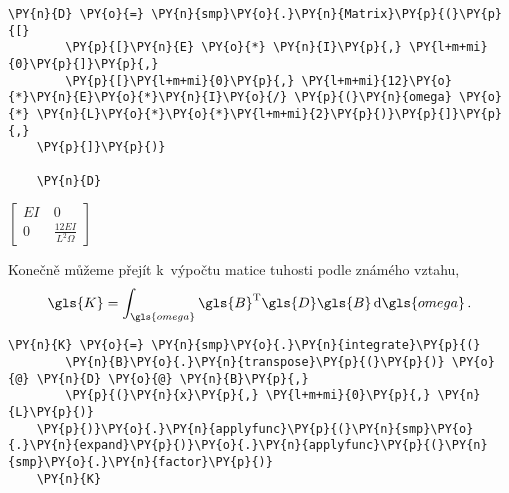 \begin{tcolorbox}[breakable, size=fbox, boxrule=1pt, pad at break*=1mm,colback=cellbackground, colframe=cellborder]
    \begin{Verbatim}[commandchars=\\\{\}]
    \PY{n}{D} \PY{o}{=} \PY{n}{smp}\PY{o}{.}\PY{n}{Matrix}\PY{p}{(}\PY{p}{[}
        \PY{p}{[}\PY{n}{E} \PY{o}{*} \PY{n}{I}\PY{p}{,} \PY{l+m+mi}{0}\PY{p}{]}\PY{p}{,}
        \PY{p}{[}\PY{l+m+mi}{0}\PY{p}{,} \PY{l+m+mi}{12}\PY{o}{*}\PY{n}{E}\PY{o}{*}\PY{n}{I}\PY{o}{/} \PY{p}{(}\PY{n}{omega} \PY{o}{*} \PY{n}{L}\PY{o}{*}\PY{o}{*}\PY{l+m+mi}{2}\PY{p}{)}\PY{p}{]}\PY{p}{,}
    \PY{p}{]}\PY{p}{)}
    
    \PY{n}{D}
    \end{Verbatim}
\end{tcolorbox}
     
                
    
    $\displaystyle \left[\begin{matrix}E I~& 0\\0 & \frac{12 E I}{L^{2} \Omega}\end{matrix}\right]$

\vspace{0.3cm}
Konečně můžeme přejít k~výpočtu matice tuhosti podle známého vztahu,
\begin{equation*}
    \gls{K} = \int_{\gls{omega}} \gls{B}^{\mathrm{T}}\gls{D}\gls{B} \dd{\gls{omega}}.
\end{equation*}

\begin{tcolorbox}[breakable, size=fbox, boxrule=1pt, pad at break*=1mm,colback=cellbackground, colframe=cellborder]
    \begin{Verbatim}[commandchars=\\\{\}]
    \PY{n}{K} \PY{o}{=} \PY{n}{smp}\PY{o}{.}\PY{n}{integrate}\PY{p}{(}
        \PY{n}{B}\PY{o}{.}\PY{n}{transpose}\PY{p}{(}\PY{p}{)} \PY{o}{@} \PY{n}{D} \PY{o}{@} \PY{n}{B}\PY{p}{,}
        \PY{p}{(}\PY{n}{x}\PY{p}{,} \PY{l+m+mi}{0}\PY{p}{,} \PY{n}{L}\PY{p}{)}
    \PY{p}{)}\PY{o}{.}\PY{n}{applyfunc}\PY{p}{(}\PY{n}{smp}\PY{o}{.}\PY{n}{expand}\PY{p}{)}\PY{o}{.}\PY{n}{applyfunc}\PY{p}{(}\PY{n}{smp}\PY{o}{.}\PY{n}{factor}\PY{p}{)}
    \PY{n}{K}
    \end{Verbatim}
\end{tcolorbox}
     
                
    
